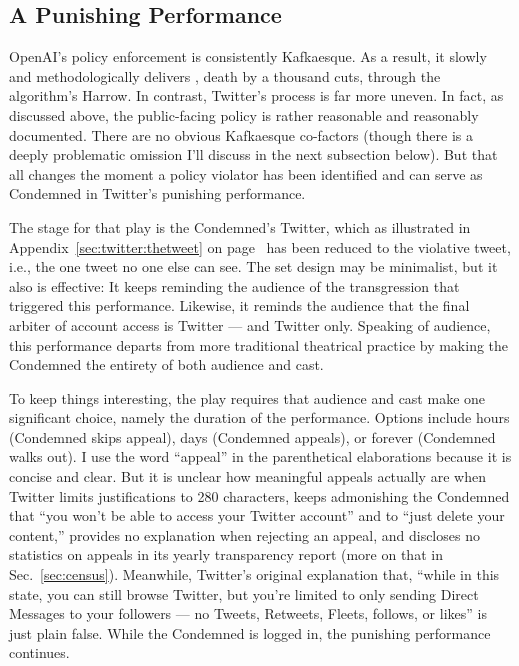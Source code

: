 \subsection{A Punishing Performance}

OpenAI's policy enforcement is consistently Kafkaesque. As a result, it slowly
and methodologically delivers \lingchi, death by a thousand cuts, through the
algorithm's Harrow. In contrast, Twitter's process is far more uneven. In fact,
as discussed above, the public-facing policy is rather reasonable and reasonably
documented. There are no obvious Kafkaesque co-factors (though there is a deeply
problematic omission I'll discuss in the next subsection below). But that all
changes the moment a policy violator has been identified and can serve as
Condemned in Twitter's punishing performance.

The stage for that play is the Condemned's Twitter, which as illustrated in
Appendix~\ref{sec:twitter:thetweet} on page~\pageref{sec:twitter:thetweet} has
been reduced to the violative tweet, i.e., the one tweet no one else can see.
The set design may be minimalist, but it also is effective: It keeps reminding
the audience of the transgression that triggered this performance. Likewise, it
reminds the audience that the final arbiter of account access is Twitter --- and
Twitter only. Speaking of audience, this performance departs from more
traditional theatrical practice by making the Condemned the entirety of both
audience and cast.

To keep things interesting, the play requires that audience and cast make one
significant choice, namely the duration of the performance. Options include
hours (Condemned skips appeal), days (Condemned appeals), or forever (Condemned
walks out). I use the word ``appeal'' in the parenthetical elaborations because
it is concise and clear. But it is unclear how meaningful appeals actually are
when Twitter limits justifications to 280 characters, keeps admonishing the
Condemned that ``you won't be able to access your Twitter account'' and to
``just delete your content,'' provides no explanation when rejecting an appeal,
and discloses no statistics on appeals in its yearly transparency report (more
on that in Sec.~\ref{sec:census}). Meanwhile, Twitter's original explanation
that, ``while in this state, you can still browse Twitter, but you're limited to
only sending Direct Messages to your followers --- no Tweets, Retweets, Fleets,
follows, or likes'' is just plain false. While the Condemned is logged in, the
punishing performance continues.

